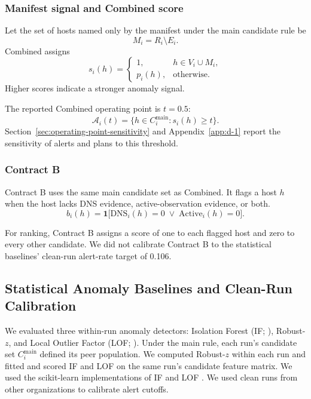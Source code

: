 \documentclass[sn-basic]{sn-jnl}%
\theoremstyle{thmstyleone}%
\theoremstyle{thmstyletwo}%
\theoremstyle{thmstylethree}%
\begin{document}
\subsubsection{Manifest signal and Combined score}\label{sec:combined-score}

Let the set of hosts named only by the manifest under the main candidate rule be
\[
M_i = R_i \setminus E_i.
\]
Combined assigns
\[
s_i(h)
=
\begin{cases}
1,      & h \in V_i \cup M_i, \\
p_i(h), & \text{otherwise}.
\end{cases}
\]
Higher scores indicate a stronger anomaly signal.

The reported Combined operating point is \(t = 0.5\):
\[
\mathcal{A}_i(t)
=
\bigl\{ h \in C_i^{\mathrm{main}} : s_i(h) \ge t \bigr\}.
\]
Section~\ref{sec:operating-point-sensitivity} and Appendix~\ref{app:d-1} report the sensitivity of alerts and plans to this threshold.

\subsubsection{Contract B}\label{sec:contract-b}

Contract B uses the same main candidate set as Combined. It flags a host \(h\) when the host lacks DNS evidence, active-observation evidence, or both.
\[
b_i(h)
=
\mathbf{1}\bigl[
    \mathrm{DNS}_i(h) = 0
    \;\lor\;
    \mathrm{Active}_i(h) = 0
\bigr].
\]

For ranking, Contract B assigns a score of one to each flagged host and zero to every other candidate. We did not calibrate Contract B to the statistical baselines' clean-run alert-rate target of 0.106.

\subsection{Statistical Anomaly Baselines and Clean-Run Calibration}\label{sec:stat-baselines}

We evaluated three within-run anomaly detectors: Isolation Forest (IF; \citealp{liu2008}), Robust-\(z\), and Local Outlier Factor (LOF; \citealp{breunig2000}). Under the main rule, each run's candidate set \(C_i^{\mathrm{main}}\) defined its peer population. We computed Robust-\(z\) within each run and fitted and scored IF and LOF on the same run's candidate feature matrix. We used the scikit-learn implementations of IF and LOF \citep{pedregosa2011}. We used clean runs from other organizations to calibrate alert cutoffs.
\end{document}

